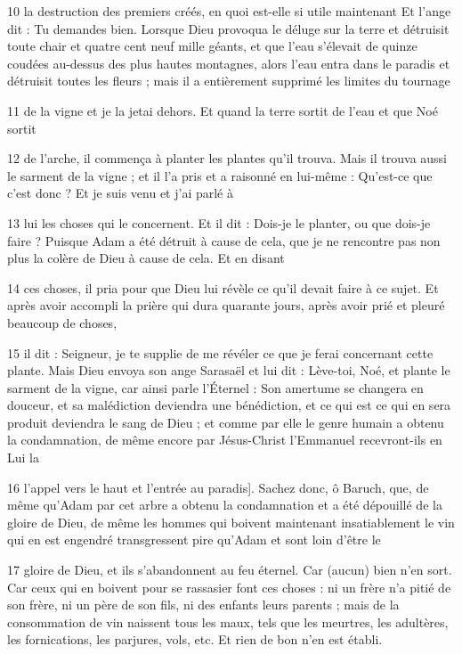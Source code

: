 \par 10 la destruction des premiers créés, en quoi est-elle si utile maintenant Et l'ange dit : Tu demandes bien. Lorsque Dieu provoqua le déluge sur la terre et détruisit toute chair et quatre cent neuf mille géants, et que l'eau s'élevait de quinze coudées au-dessus des plus hautes montagnes, alors l'eau entra dans le paradis et détruisit toutes les fleurs ; mais il a entièrement supprimé les limites du tournage

\par 11 de la vigne et je la jetai dehors. Et quand la terre sortit de l'eau et que Noé sortit

\par 12 de l'arche, il commença à planter les plantes qu'il trouva. Mais il trouva aussi le sarment de la vigne ; et il l'a pris et a raisonné en lui-même : Qu'est-ce que c'est donc ? Et je suis venu et j'ai parlé à

\par 13 lui les choses qui le concernent. Et il dit : Dois-je le planter, ou que dois-je faire ? Puisque Adam a été détruit à cause de cela, que je ne rencontre pas non plus la colère de Dieu à cause de cela. Et en disant

\par 14 ces choses, il pria pour que Dieu lui révèle ce qu'il devait faire à ce sujet. Et après avoir accompli la prière qui dura quarante jours, après avoir prié et pleuré beaucoup de choses,

\par 15 il dit : Seigneur, je te supplie de me révéler ce que je ferai concernant cette plante. Mais Dieu envoya son ange Sarasaël et lui dit : Lève-toi, Noé, et plante le sarment de la vigne, car ainsi parle l'Éternel : Son amertume se changera en douceur, et sa malédiction deviendra une bénédiction, et ce qui est ce qui en sera produit deviendra le sang de Dieu ; et comme par elle le genre humain a obtenu la condamnation, de même encore par Jésus-Christ l'Emmanuel recevront-ils en Lui la

\par 16 l'appel vers le haut et l'entrée au paradis]. Sachez donc, ô Baruch, que, de même qu'Adam par cet arbre a obtenu la condamnation et a été dépouillé de la gloire de Dieu, de même les hommes qui boivent maintenant insatiablement le vin qui en est engendré transgressent pire qu'Adam et sont loin d'être le

\par 17 gloire de Dieu, et ils s'abandonnent au feu éternel. Car (aucun) bien n’en sort. Car ceux qui en boivent pour se rassasier font ces choses : ni un frère n'a pitié de son frère, ni un père de son fils, ni des enfants leurs parents ; mais de la consommation de vin naissent tous les maux, tels que les meurtres, les adultères, les fornications, les parjures, vols, etc. Et rien de bon n’en est établi.

